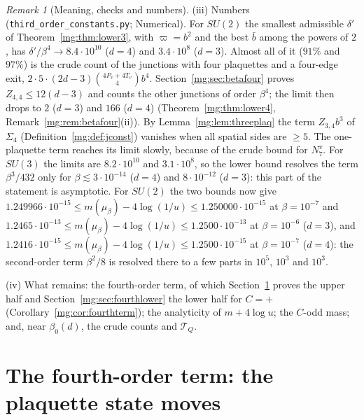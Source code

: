 \documentclass[11pt,a4paper]{article}
\theoremstyle{definition}
\theoremstyle{remark}
\newtheorem{remark}[theorem]{Remark}
\begin{document}
\begin{remark}[Meaning, checks and numbers]
(iii) Numbers (\texttt{third\_order\_constants.py}; Numerical). For $SU(2)$ the smallest admissible $\delta'$ of Theorem~\ref{mg:thm:lower3}, with $\varpi=b^2$ and the
best $\bar b$ among the powers of $2$, has $\delta'/\beta^4\to8.4\cdot10^{10}$ ($d=4$) and $3.4\cdot10^8$ ($d=3$). Almost all of it ($91\%$ and $97\%$) is the crude
count of the junctions with four plaquettes and a four-edge exit, $2\cdot5\cdot(2d-3)\binom{4P_v+4T_v}4b^4$. Section~\ref{mg:sec:betafour} proves $Z_{4,4}\le12(d-3)$ and
counts the other junctions of order $\beta^4$; the limit then drops to $2$ ($d=3$) and $166$ ($d=4$) (Theorem~\ref{mg:thm:lower4},
Remark~\ref{mg:rem:betafour}(ii)). By Lemma~\ref{mg:lem:threeplaq} the term $Z_{3,4}b^3$ of $\Sigma_4$
(Definition~\ref{mg:def:jconst}) vanishes when all spatial sides are $\ge5$. The one-plaquette term reaches its limit slowly, because of the crude bound for
$N^v_7$. For $SU(3)$ the limits are $8.2\cdot10^{10}$ and $3.1\cdot10^8$, so the
lower bound resolves the term $\beta^3/432$ only for $\beta\lesssim3\cdot10^{-14}$ ($d=4$) and $8\cdot10^{-12}$ ($d=3$): this part of the statement is
asymptotic. For $SU(2)$ the two bounds now give $1.249966\cdot10^{-15}\le m(\mu_\beta)-4\log(1/u)\le1.250000\cdot10^{-15}$ at $\beta=10^{-7}$ and
$1.2465\cdot10^{-13}\le m(\mu_\beta)-4\log(1/u)\le1.2500\cdot10^{-13}$ at $\beta=10^{-6}$ ($d=3$), and $1.2416\cdot10^{-15}\le m(\mu_\beta)-4\log(1/u)\le1.2500\cdot10^{-15}$
at $\beta=10^{-7}$ ($d=4$): the second-order term $\beta^2/8$ is resolved there to a few parts in $10^5$, $10^3$ and $10^3$.

(iv) What remains: the fourth-order term, of which Section~\ref{mg:sec:fourth} proves the upper half and Section~\ref{mg:sec:fourthlower} the lower half for $C=+$
(Corollary~\ref{mg:cor:fourthterm}); the analyticity of
$m+4\log u$; the $C$-odd mass; and, near $\beta_0(d)$, the crude counts and $\mathcal T_Q$.
\end{remark}

\section{The fourth-order term: the plaquette state moves}\label{mg:sec:fourth}
\end{document}
